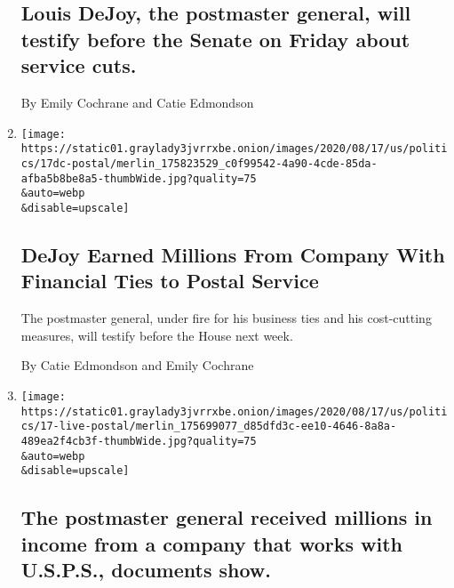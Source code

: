 \begin{enumerate}
  \hypertarget{louis-dejoy-the-postmaster-general-will-testify-before-the-senate-on-friday-about-service-cuts}{%
  \subsection{Louis DeJoy, the postmaster general, will testify before
  the Senate on Friday about service
  cuts.}\label{louis-dejoy-the-postmaster-general-will-testify-before-the-senate-on-friday-about-service-cuts}}

  By Emily Cochrane and Catie Edmondson
\item
  \href{/2020/08/17/us/politics/dejoy-postal-service-mail-in-voting.html}{}

  \texttt{[image: https://static01.graylady3jvrrxbe.onion/images/2020/08/17/us/politics/17dc-postal/merlin\_175823529\_c0f99542-4a90-4cde-85da-afba5b8be8a5-thumbWide.jpg?quality=75\\\&auto=webp\\\&disable=upscale]}

  \hypertarget{dejoy-earned-millions-from-company-with-financial-ties-to-postal-service}{%
  \subsection{DeJoy Earned Millions From Company With Financial Ties to
  Postal
  Service}\label{dejoy-earned-millions-from-company-with-financial-ties-to-postal-service}}

  The postmaster general, under fire for his business ties and his
  cost-cutting measures, will testify before the House next week.

  By Catie Edmondson and Emily Cochrane
\item
  \href{/live/2020/08/17/us/dnc-convention/the-postmaster-general-received-millions-in-income-from-a-company-that-works-with-usps-documents-show}{}

  \texttt{[image: https://static01.graylady3jvrrxbe.onion/images/2020/08/17/us/politics/17-live-postal/merlin\_175699077\_d85dfd3c-ee10-4646-8a8a-489ea2f4cb3f-thumbWide.jpg?quality=75\\\&auto=webp\\\&disable=upscale]}

  \hypertarget{the-postmaster-general-received-millions-in-income-from-a-company-that-works-with-usps-documents-show}{%
  \subsection{The postmaster general received millions in income from a
  company that works with U.S.P.S., documents
  show.}\label{the-postmaster-general-received-millions-in-income-from-a-company-that-works-with-usps-documents-show}}


\end{enumerate}
